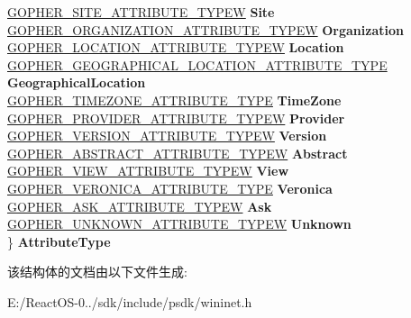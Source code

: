 \begin{DoxyCompactItemize}
\begin{tabbing}
\>\hyperlink{struct_g_o_p_h_e_r___s_i_t_e___a_t_t_r_i_b_u_t_e___t_y_p_e_w}{GOPHER\_SITE\_ATTRIBUTE\_TYPEW} {\bfseries Site}\\
\>\hyperlink{struct_g_o_p_h_e_r___o_r_g_a_n_i_z_a_t_i_o_n___a_t_t_r_i_b_u_t_e___t_y_p_e_w}{GOPHER\_ORGANIZATION\_ATTRIBUTE\_TYPEW} {\bfseries Organization}\\
\>\hyperlink{struct_g_o_p_h_e_r___l_o_c_a_t_i_o_n___a_t_t_r_i_b_u_t_e___t_y_p_e_w}{GOPHER\_LOCATION\_ATTRIBUTE\_TYPEW} {\bfseries Location}\\
\>\hyperlink{struct_g_o_p_h_e_r___g_e_o_g_r_a_p_h_i_c_a_l___l_o_c_a_t_i_o_n___a_t_t_r_i_b_u_t_e___t_y_p_e}{GOPHER\_GEOGRAPHICAL\_LOCATION\_ATTRIBUTE\_TYPE} {\bfseries GeographicalLocation}\\
\>\hyperlink{struct_g_o_p_h_e_r___t_i_m_e_z_o_n_e___a_t_t_r_i_b_u_t_e___t_y_p_e}{GOPHER\_TIMEZONE\_ATTRIBUTE\_TYPE} {\bfseries TimeZone}\\
\>\hyperlink{struct_g_o_p_h_e_r___p_r_o_v_i_d_e_r___a_t_t_r_i_b_u_t_e___t_y_p_e_w}{GOPHER\_PROVIDER\_ATTRIBUTE\_TYPEW} {\bfseries Provider}\\
\>\hyperlink{struct_g_o_p_h_e_r___v_e_r_s_i_o_n___a_t_t_r_i_b_u_t_e___t_y_p_e_w}{GOPHER\_VERSION\_ATTRIBUTE\_TYPEW} {\bfseries Version}\\
\>\hyperlink{struct_g_o_p_h_e_r___a_b_s_t_r_a_c_t___a_t_t_r_i_b_u_t_e___t_y_p_e_w}{GOPHER\_ABSTRACT\_ATTRIBUTE\_TYPEW} {\bfseries Abstract}\\
\>\hyperlink{struct_g_o_p_h_e_r___v_i_e_w___a_t_t_r_i_b_u_t_e___t_y_p_e_w}{GOPHER\_VIEW\_ATTRIBUTE\_TYPEW} {\bfseries View}\\
\>\hyperlink{struct_g_o_p_h_e_r___v_e_r_o_n_i_c_a___a_t_t_r_i_b_u_t_e___t_y_p_e}{GOPHER\_VERONICA\_ATTRIBUTE\_TYPE} {\bfseries Veronica}\\
\>\hyperlink{struct_g_o_p_h_e_r___a_s_k___a_t_t_r_i_b_u_t_e___t_y_p_e_w}{GOPHER\_ASK\_ATTRIBUTE\_TYPEW} {\bfseries Ask}\\
\>\hyperlink{struct_g_o_p_h_e_r___u_n_k_n_o_w_n___a_t_t_r_i_b_u_t_e___t_y_p_e_w}{GOPHER\_UNKNOWN\_ATTRIBUTE\_TYPEW} {\bfseries Unknown}\\
\} {\bfseries AttributeType}\\

\end{tabbing}\end{DoxyCompactItemize}


该结构体的文档由以下文件生成\+:\begin{DoxyCompactItemize}
\item 
E\+:/\+React\+O\+S-\/0../sdk/include/psdk/wininet.\+h\end{DoxyCompactItemize}
